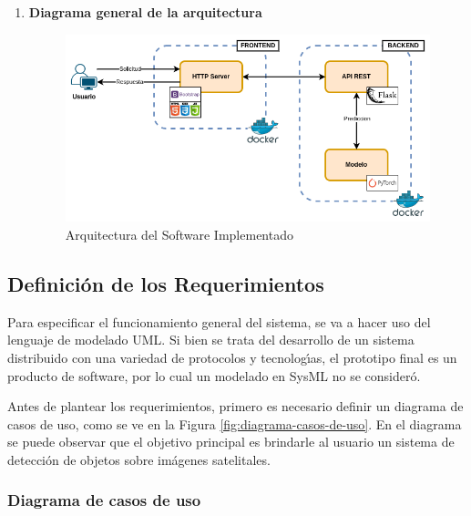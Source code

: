 \begin{enumerate}
    \item \textbf{Diagrama general de la arquitectura }
    \begin{figure}[h!]
        \centering
        \includegraphics[width=1\textwidth,center]{img/BE - API - FE.drawio.png}
        \caption{Arquitectura del Software Implementado}
        \label{fig:be - api - fe}
    \end{figure}
    
    
\end{enumerate}

\newpage
\subsection{Definición de los Requerimientos}

Para especificar el funcionamiento general del sistema, se va a hacer uso del lenguaje de modelado UML. Si bien se trata del desarrollo de un sistema distribuido con una variedad de protocolos y tecnologı́as, el prototipo final es un producto de software, por lo cual un modelado en SysML \cite{sysml} no se consideró.

Antes de plantear los requerimientos, primero es necesario definir un diagrama de casos de uso, como se ve en la Figura \ref{fig:diagrama-casos-de-uso}. En el diagrama se puede observar que el objetivo principal es brindarle al usuario un sistema de detección de objetos sobre imágenes satelitales.


\subsubsection {Diagrama de casos de uso}


